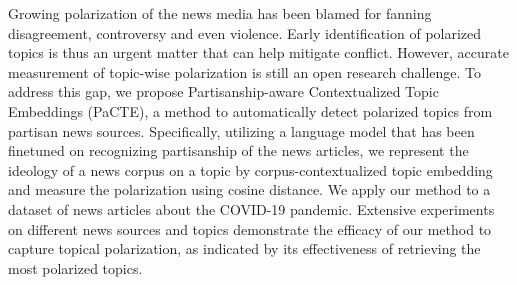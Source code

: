Growing polarization of the news media has been blamed for fanning disagreement, controversy and even violence. Early identification of polarized topics is thus an urgent matter that can help mitigate conflict. However, accurate measurement of topic-wise polarization is still an open research challenge. To address this gap, we propose Partisanship-aware Contextualized Topic Embeddings (PaCTE), a method to automatically detect polarized topics from partisan news sources. Specifically, utilizing a language model that has been finetuned on recognizing partisanship of the news articles, we represent the ideology of a news corpus on a topic by corpus-contextualized topic embedding and measure the polarization using cosine distance. We apply our method to a dataset of news articles about the COVID-19 pandemic. Extensive experiments on different news sources and topics demonstrate the efficacy of our method to capture topical polarization, as indicated by its effectiveness of retrieving the most polarized topics.
